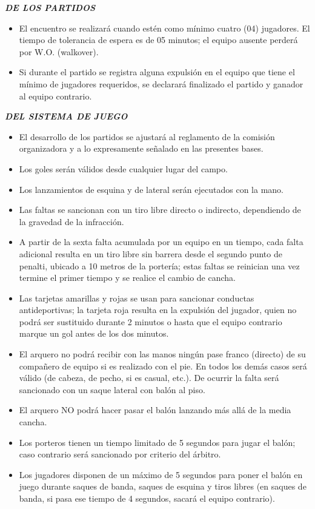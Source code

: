 \documentclass[11pt,a4paper]{article}
\newcommand{\titulo}[1]{\par\medskip\textbf{\textit{#1}}\par}
\begin{document}
\titulo{DE LOS PARTIDOS}
\begin{itemize}
	\item El encuentro se realizará cuando estén como mínimo cuatro (04) jugadores. El tiempo de tolerancia de espera es de 05 minutos; el equipo ausente perderá por W.O. (walkover).
	\item Si durante el partido se registra alguna expulsión en el equipo que tiene el mínimo de jugadores requeridos, se declarará finalizado el partido y ganador al equipo contrario.
\end{itemize}

\titulo{DEL SISTEMA DE JUEGO}
\begin{itemize}
	\item El desarrollo de los partidos se ajustará al reglamento de la comisión organizadora y a lo expresamente señalado en las presentes bases.
	\item Los goles serán válidos desde cualquier lugar del campo.
	\item Los lanzamientos de esquina y de lateral serán ejecutados con la mano.
	\item Las faltas se sancionan con un tiro libre directo o indirecto, dependiendo de la gravedad de la infracción.
	\item A partir de la sexta falta acumulada por un equipo en un tiempo, cada falta adicional resulta en un tiro libre sin barrera desde el segundo punto de penalti, ubicado a 10 metros de la portería; estas faltas se reinician una vez termine el primer tiempo y se realice el cambio de cancha.
	\item Las tarjetas amarillas y rojas se usan para sancionar conductas antideportivas; la tarjeta roja resulta en la expulsión del jugador, quien no podrá ser sustituido durante 2 minutos o hasta que el equipo contrario marque un gol antes de los dos minutos.
	\item El arquero no podrá recibir con las manos ningún pase franco (directo) de su compañero de equipo si es realizado con el pie. En todos los demás casos será válido (de cabeza, de pecho, si es casual, etc.). De ocurrir la falta será sancionado con un saque lateral con balón al piso.
	\item El arquero NO podrá hacer pasar el balón lanzando más allá de la media cancha.
	\item Los porteros tienen un tiempo limitado de 5 segundos para jugar el balón; caso contrario será sancionado por criterio del árbitro.
	\item Los jugadores disponen de un máximo de 5 segundos para poner el balón en juego durante saques de banda, saques de esquina y tiros libres (en saques de banda, si pasa ese tiempo de 4 segundos, sacará el equipo contrario).

\end{itemize}
\end{document}
